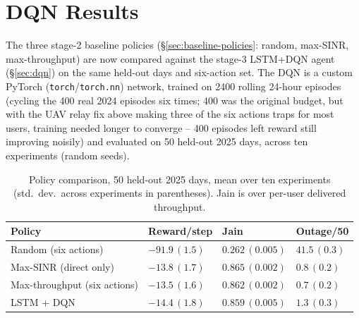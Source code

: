 \documentclass[]{ieeeaccess}
\begin{document}
\section{DQN Results}
\label{sec:dqn-results}

The three stage-2 baseline policies (\S\ref{sec:baseline-policies}: random, max-SINR, max-throughput) are now compared against the stage-3 LSTM+DQN agent (\S\ref{sec:dqn}) on the same held-out days and six-action set. The DQN is a custom PyTorch (\texttt{torch}/\texttt{torch.nn}) network, trained on 2400 rolling 24-hour episodes (cycling the 400 real 2024 episodes six times; 400 was the original budget, but with the UAV relay fix above making three of the six actions traps for most users, training needed longer to converge -- 400 episodes left reward still improving noisily) and evaluated on 50 held-out 2025 days, across ten experiments (random seeds).

\begin{table}[t]
\centering
\caption{Policy comparison, 50 held-out 2025 days, mean over ten experiments (std.\ dev.\ across experiments in parentheses). Jain is over per-user delivered throughput.}
\label{tab:dqn-all-policies}
{\scriptsize\setlength{\tabcolsep}{3pt}
\begin{tabularx}{\columnwidth}{|>{\raggedright\arraybackslash}X|>{\centering\arraybackslash}X|>{\centering\arraybackslash}X|>{\centering\arraybackslash}X|}
\hline
\textbf{Policy} & \textbf{Reward/step} & \textbf{Jain} & \textbf{Outage/50} \\
\hline
Random (six actions) & $-91.9\,(1.5)$ & $0.262\,(0.005)$ & $41.5\,(0.3)$ \\
\hline
Max-SINR (direct only) & $-13.8\,(1.7)$ & $\mathbf{0.865}\,(0.002)$ & $0.8\,(0.2)$ \\
\hline
Max-throughput (six actions) & $\mathbf{-13.5}\,(1.6)$ & $0.862\,(0.002)$ & $\mathbf{0.7}\,(0.2)$ \\
\hline
LSTM + DQN & $-14.4\,(1.8)$ & $0.859\,(0.005)$ & $1.3\,(0.3)$ \\
\hline
\end{tabularx}}
\end{table}
\end{document}
